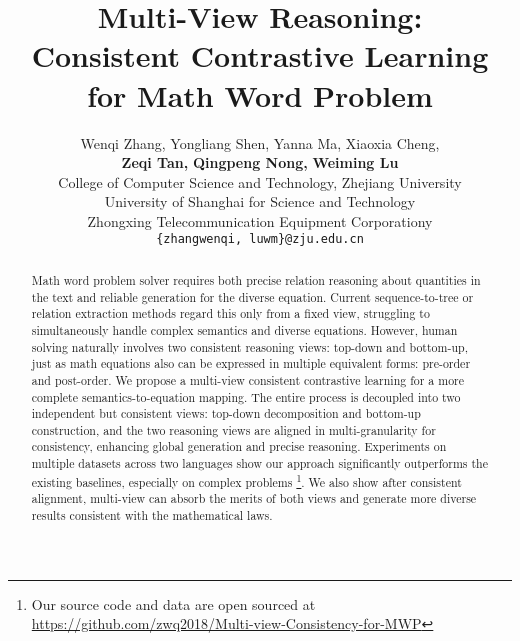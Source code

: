 \documentclass[11pt]{article}
\title{Multi-View Reasoning: \\
Consistent Contrastive Learning for Math Word Problem}
\author{Wenqi Zhang,
  Yongliang Shen,
  Yanna Ma,
  Xiaoxia Cheng, \\
  {\bf Zeqi Tan,}
  {\bf Qingpeng Nong,}
  {\bf Weiming Lu\footnotemark[2]}\\
  College of Computer Science and Technology, Zhejiang University \\
  University of Shanghai for Science and Technology\\
  Zhongxing Telecommunication Equipment Corporationy\\
  \texttt{\{zhangwenqi, luwm\}@zju.edu.cn} }
\begin{document}
\maketitle

\renewcommand{\thefootnote}{\fnsymbol{footnote}}   \renewcommand{\thefootnote}{\arabic{footnote}}

\begin{abstract}
Math word problem solver requires both precise relation reasoning about quantities in the text and reliable generation for the diverse equation. Current sequence-to-tree or relation extraction methods regard this only from a fixed view, struggling to simultaneously handle complex semantics and diverse equations. However, human solving naturally involves two consistent reasoning views: top-down and bottom-up, just as math equations also can be expressed in multiple equivalent forms: pre-order and post-order. We propose a multi-view consistent contrastive learning for a more complete semantics-to-equation mapping. The entire process is decoupled into two independent but consistent views: top-down decomposition and bottom-up construction, and the two reasoning views are aligned in multi-granularity for consistency, enhancing global generation and precise reasoning. Experiments on multiple datasets across two languages show our approach significantly outperforms the existing baselines, especially on complex problems \footnote{Our source code and data are 
open sourced at \url{https://github.com/zwq2018/Multi-view-Consistency-for-MWP}}. We also show after consistent alignment, multi-view can absorb the merits of both views and generate more diverse results consistent with the mathematical laws.
\end{abstract}
\end{document}
